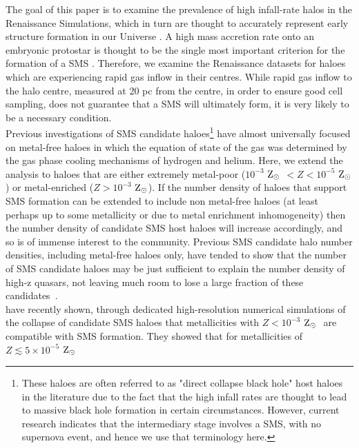 \documentclass[graphics, twocolumn, usenatbib]{mn2e}
\newcommand{\zsolar} {$\rm{Z_{\odot}}~$}
\newcommand{\zsolarc} {$\rm{Z_{\odot}}$}
\begin{document}
The goal of this paper is to examine the prevalence of high infall-rate halos in the
Renaissance Simulations, which in turn are thought to accurately represent early structure formation in our Universe \citep{Chen_2014, Xu_2013, Xu_2014, OShea_2015,
  Barrow_2017, Wise_2019}. A high mass accretion rate onto an embryonic protostar is thought to be the
single most important criterion for the formation of a SMS \citep{Hosokawa_2013, Sakurai_2016,
  Woods_2018}. Therefore, we examine the Renaissance datasets for haloes which are experiencing
rapid gas inflow in their centres. While rapid gas inflow to the halo centre, 
measured at 20 pc from the centre, in order to ensure good cell sampling,
does not guarantee
that a SMS will ultimately form, it is very likely to be a necessary condition. \\
\indent Previous investigations of SMS candidate haloes\footnote{These haloes are often
  referred to as "direct collapse black hole" host haloes in the literature due to the fact
  that the high infall rates are thought to lead to massive black hole formation in certain
  circumstances. However, current research indicates that the intermediary stage involves a
  SMS, with no supernova event, and hence we use that terminology here.} have almost
universally focused on
metal-free haloes in which the equation of state of the gas was determined by the gas phase
cooling mechanisms of hydrogen and helium. Here, we extend the analysis to haloes that are either
extremely metal-poor ($10^{-3}$ \zsolar $< Z < 10^{-5}$ \zsolarc) or metal-enriched ($Z > 10^{-3}$ \zsolarc). If the number density of haloes that support SMS formation
can be extended to include non metal-free haloes (at least perhaps up to some
metallicity or due to metal enrichment inhomogeneity) then the
number density of candidate SMS host haloes will increase accordingly, and so is of
immense interest to the community. 
Previous SMS candidate halo number densities, including metal-free haloes only,
have tended to show that the number of SMS candidate haloes may be just sufficient to explain the number density of high-z quasars,
not leaving much room to lose a large fraction of these candidates~\citep{Agarwal_2012, Visbal_2014b, Agarwal_2015b, Latif_2014a,
  Valiante_2016, Habouzit_2016, Valiante_2017, Habouzit_2017, Regan_2017}. \\
\indent \cite{Chon_2020} have recently shown, through dedicated high-resolution numerical simulations
of the collapse of candidate SMS haloes that metallicities with $Z < 10^{-3}$ \zsolar
are compatible with SMS formation. They showed that for metallicities of $Z \lesssim 5 \times 10^{-5}$ \zsolar
\end{document}
